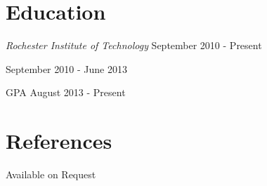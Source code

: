 \documentclass[line,margin]{res}
\begin{document}
\begin{resume}
\section{Education}
{\sl Rochester Institute of Technology} \hfill September 2010 - Present

 \hfill September 2010 - June 2013

  GPA \hfill August 2013 - Present


\section{References}
Available on Request


\end{resume}
\end{document}
